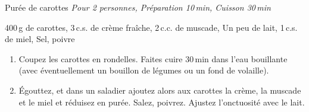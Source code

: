 \begin{recette}{Purée de carottes}
  \emph{Pour 2 personnes, Préparation 10\,min,	Cuisson 30\,min}
  \begin{ingredients}
    400\,g de carottes\sep
    3\,c.s. de crème fraîche\sep
    2\,c.c. de muscade\sep
    Un peu de lait\sep
    1\,c.s. de miel\sep
    Sel, poivre
  \end{ingredients}
	\begin{enumerate}
  \item Coupez les carottes en rondelles. Faites cuire 30\,min dans l'eau bouillante (avec éventuellement un bouillon de légumes ou un fond de volaille).
  \item Égouttez, et dans un saladier ajoutez alors aux carottes  la crème, la muscade et le miel et réduisez en purée. Salez, poivrez. Ajustez l'onctuosité avec le lait.
  \end{enumerate}
\end{recette}
